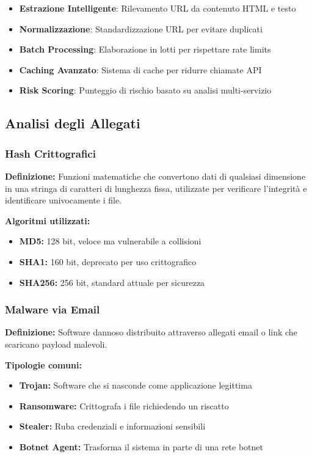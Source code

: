 \documentclass{article}
\begin{document}
\begin{itemize}
    \item \textbf{Estrazione Intelligente}: Rilevamento URL da contenuto HTML e testo
    \item \textbf{Normalizzazione}: Standardizzazione URL per evitare duplicati
    \item \textbf{Batch Processing}: Elaborazione in lotti per rispettare rate limits
    \item \textbf{Caching Avanzato}: Sistema di cache per ridurre chiamate API
    \item \textbf{Risk Scoring}: Punteggio di rischio basato su analisi multi-servizio
\end{itemize}

\subsection{Analisi degli Allegati}

\subsubsection{Hash Crittografici}
\textbf{Definizione:} Funzioni matematiche che convertono dati di qualsiasi dimensione in una stringa di caratteri di lunghezza fissa, utilizzate per verificare l'integrità e identificare univocamente i file.

\textbf{Algoritmi utilizzati:}
\begin{itemize}
    \item \textbf{MD5:} 128 bit, veloce ma vulnerabile a collisioni
    \item \textbf{SHA1:} 160 bit, deprecato per uso crittografico
    \item \textbf{SHA256:} 256 bit, standard attuale per sicurezza
\end{itemize}

\subsubsection{Malware via Email}
\textbf{Definizione:} Software dannoso distribuito attraverso allegati email o link che scaricano payload malevoli.

\textbf{Tipologie comuni:}
\begin{itemize}
    \item \textbf{Trojan:} Software che si nasconde come applicazione legittima
    \item \textbf{Ransomware:} Crittografa i file richiedendo un riscatto
    \item \textbf{Stealer:} Ruba credenziali e informazioni sensibili
    \item \textbf{Botnet Agent:} Trasforma il sistema in parte di una rete botnet
\end{itemize}
\end{document}
